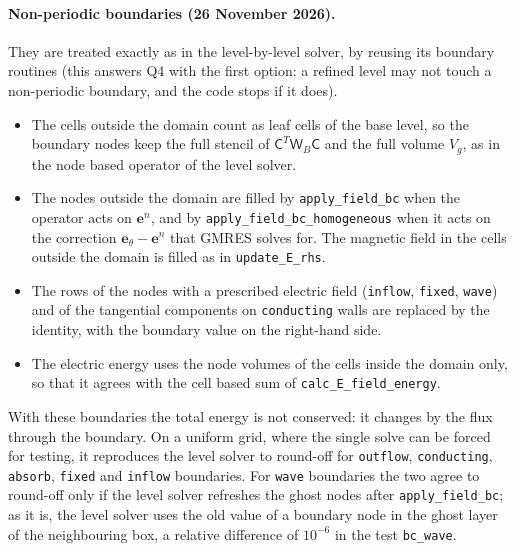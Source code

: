 \documentclass[a4paper,11pt]{article}
\newcommand{\code}[1]{\texttt{#1}}
\newcommand{\EE}{\mathbf{e}}
\newcommand{\Cm}{\mathsf{C}}
\newcommand{\Wb}{\mathsf{W}_B}
\begin{document}
\paragraph{Non-periodic boundaries (26 November 2026).} They are treated
exactly as in the level-by-level solver, by reusing its boundary routines
(this answers Q4 with the first option: a refined level may not touch a non-periodic
boundary, and the code stops if it does).
\begin{itemize}
\item The cells outside the domain count as leaf cells of the base level, so the
  boundary nodes keep the full stencil of $\Cm^T\Wb\Cm$ and the full volume $V_g$,
  as in the node based operator of the level solver.
\item The nodes outside the domain are filled by \code{apply\_field\_bc} when the
  operator acts on $\EE^n$, and by \code{apply\_field\_bc\_homogeneous} when it acts
  on the correction $\EE_\theta-\EE^n$ that GMRES solves for. The magnetic field in
  the cells outside the domain is filled as in \code{update\_E\_rhs}.
\item The rows of the nodes with a prescribed electric field (\code{inflow},
  \code{fixed}, \code{wave}) and of the tangential components on \code{conducting}
  walls are replaced by the identity, with the boundary value on the right-hand side.
\item The electric energy uses the node volumes of the cells inside the domain only,
  so that it agrees with the cell based sum of \code{calc\_E\_field\_energy}.
\end{itemize}
With these boundaries the total energy is not conserved: it changes by the flux
through the boundary. On a uniform grid, where the single solve can be forced for
testing, it reproduces the level solver to round-off for \code{outflow},
\code{conducting}, \code{absorb}, \code{fixed} and \code{inflow} boundaries. For
\code{wave} boundaries the two agree to round-off only if the level solver refreshes
the ghost nodes after \code{apply\_field\_bc}; as it is, the level solver uses the
old value of a boundary node in the ghost layer of the neighbouring box, a relative
difference of $10^{-6}$ in the test \code{bc\_wave}.
\end{document}
